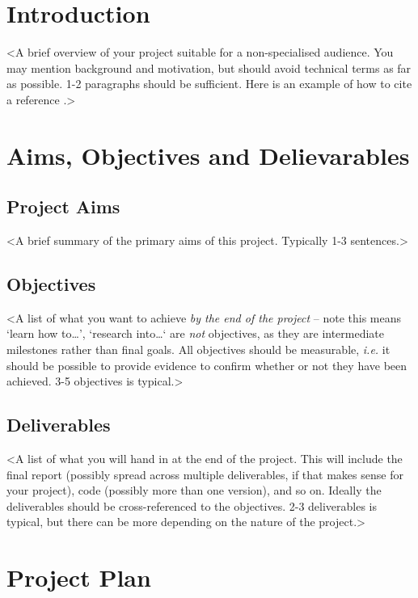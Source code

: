%
%
\section{Introduction}

<A brief overview of your project suitable for a non-specialised audience. You may mention background and motivation, but should avoid technical terms as far as possible. 1-2 paragraphs should be sufficient. Here is an example of how to cite a reference \cite{parikh1980adaptive}.>


%
%
\section{Aims, Objectives and Delievarables}

\subsection{Project Aims}

<A brief summary of the primary aims of this project. Typically 1-3 sentences.>

\subsection{Objectives}

<A list of what you want to achieve {\em by the end of the project} -- note this means `learn how to\ldots', `research into\ldots` are {\em not} objectives, as they are intermediate milestones rather than final goals. All objectives should be measurable, {\em i.e.} it should be possible to provide evidence to confirm whether or not they have been achieved. 3-5 objectives is typical.>

\subsection{Deliverables}

<A list of what you will hand in at the end of the project. This will include the final report (possibly spread across multiple deliverables, if that makes sense for your project), code (possibly more than one version), and so on. Ideally the deliverables should be cross-referenced to the objectives. 2-3 deliverables is typical, but there can be more depending on the nature of the project.>


%
%
\section{Project Plan}

